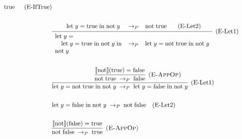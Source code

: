 \begin{align*}
{{{\begin{array}{l}
        \end{array}}
        {\begin{array}{l}
          \true
        \end{array}}
        \quad \ERuleIfTrue
    }
  } \\\\
  & \infer[\ERuleLetCtx] {
    \Reduce{P}
      {\begin{array}{l}
        \Let{\; y}
          {\\ \quad \Let{\; y}{\true \;}{\; \App{\mathrm{not}}{y \;}}}
          {\\ \App{\mathrm{not}}{y}}
      \end{array}}
      {\begin{array}{l}
        \Let{\; y}
          {\App{\mathrm{not}}{\true \;}}
          {\; \App{\mathrm{not}}{y}}
      \end{array}}
  } {
    \Reduce{P}
      {\begin{array}{l}
        \Let{\; y}{\true \;}{\; \App{\mathrm{not}}{y \;}}
      \end{array}}
      {\begin{array}{l}
        \App{\mathrm{not}}{\true \;}
      \end{array}}
      \quad \ERuleLetSubst
  } \\\\
  & \infer[\ERuleLetCtx] {
    \Reduce{P}
      {\Let{\; y}{\App{\mathrm{not}}{\true} \;}{\; \App{\mathrm{not}}{y}}}
      {\Let{\; y}{\false \;}{\; \App{\mathrm{not}}{y}}}
  } {
    \infer[\ERuleAppOp] {
      \Reduce{P}{\App{\mathrm{not}}{\true}}{\false}
    } {
      \sem{\mathrm{not}}\paren{\true} = \false
    }
  } \\\\
  & \Reduce{P}
    {\Let{\; y}{\false \;}{\; \App{\mathrm{not}}{y}}}
    {\App{\mathrm{not}}{\false}} \quad \ERuleLetSubst \\\\
  & \infer[\ERuleAppOp] {
    \Reduce{P}{\App{\mathrm{not}}{\false}}{\true}
  } {
    \sem{\mathrm{not}}\paren{\false} = \true
  }
\end{align*}
